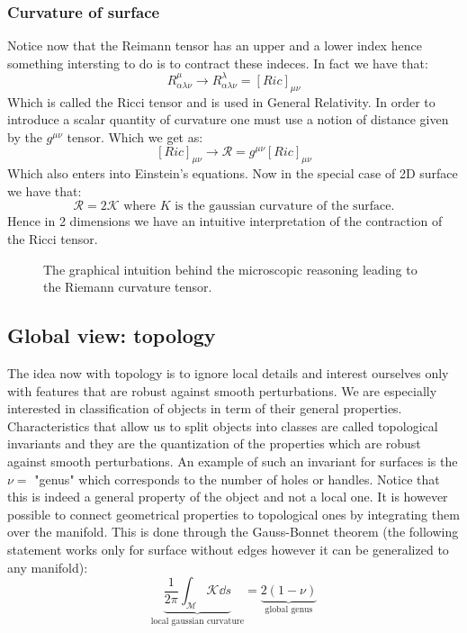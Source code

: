 \documentclass[10pt,a4paper]{book}
\begin{document}
\subsubsection{Curvature of surface}
Notice now that the Reimann tensor has an upper and a lower index hence something intersting to do is to contract these indeces. In fact we have that:
\[
R_{\alpha \lambda \nu}^\mu \to R_{\alpha \lambda \nu}^\lambda = [Ric]_{\mu \nu}
\]
Which is called the Ricci tensor and is used in General Relativity. In order to introduce a scalar quantity of curvature one must use a notion of distance given by the $g^{\mu \nu}$ tensor. Which we get as:
\[
[Ric]_{\mu \nu} \to \mathcal{R} = g^{\mu \nu} [Ric]_{\mu \nu}
\] 
Which also enters into Einstein's equations. Now in the special case of 2D surface we have that:
\[
\mathcal{R} = 2 \mathcal{K} \text{ where } K \text{ is the gaussian curvature of the surface.}
\]
Hence in 2 dimensions we have an intuitive interpretation of the contraction of the Ricci tensor. 


\begin{figure} [h]
\label{reimann-curvature}
\centering
{}
\caption{The graphical intuition behind the microscopic reasoning leading to the Riemann curvature tensor.}
\end{figure}

\subsection{Global view: topology}
The idea now with topology is to ignore local details and interest ourselves only with features that are robust against smooth perturbations. We are especially interested in classification of objects in term of their general properties. Characteristics that allow us to split objects into classes are called topological invariants and they are the quantization of the properties which are robust against smooth perturbations. An example of such an invariant for surfaces is the $\nu = $ "genus" which corresponds to the number of holes or handles. Notice that this is indeed a general property of the object and not a local one. It is however possible to connect geometrical properties to topological ones by integrating them over the manifold. This is done through the Gauss-Bonnet theorem (the following statement works only for surface without edges however it can be generalized to any manifold):
\[ 
\underbrace{\frac{1}{2\pi} \int_\mathcal{M} \mathcal{K} \dd s}_{\text{local gaussian curvature}} = \underbrace{2 (1 - \nu)}_{\text{global genus}}
\]
\end{document}
